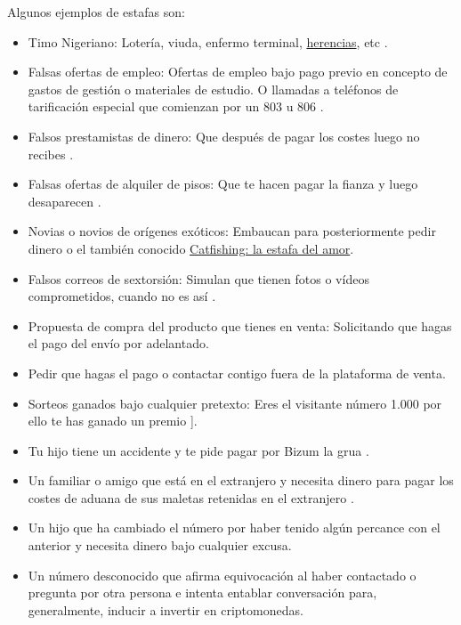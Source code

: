 \documentclass[
  a4paper,
  openany]{book}
\begin{document}
Algunos ejemplos de estafas son:

\begin{itemize}
\item
  Timo Nigeriano: Lotería, viuda, enfermo terminal, \href{https://www.incibe.es/ciudadania/blog/sabias-que-el-95-de-las-incidencias-en-ciberseguridad-se-deben-errores}{herencias}, etc \citep{WIKI-timo-nigeriano}.
\item
  Falsas ofertas de empleo: Ofertas de empleo bajo pago previo en concepto de gastos de gestión o materiales de estudio. O llamadas a teléfonos de tarificación especial que comienzan por un 803 u 806 \citep{INCI-falsas-ofertas-empleo}.
\item
  Falsos prestamistas de dinero: Que después de pagar los costes luego no recibes \citep{INCI-falsos-prestamos}.
\item
  Falsas ofertas de alquiler de pisos: Que te hacen pagar la fianza y luego desaparecen \citep{INCI-falsos-alquileres}.
\item
  Novias o novios de orígenes exóticos: Embaucan para posteriormente pedir dinero \citep{INCI-novias-exoticas} o el también conocido \href{https://www.incibe.es/ciudadania/blog/catfishing-la-estafa-del-amor}{Catfishing: la estafa del amor}.
\item
  Falsos correos de sextorsión: Simulan que tienen fotos o vídeos comprometidos, cuando no es así \citep{INCI-correos-sextorsion}.
\item
  Propuesta de compra del producto que tienes en venta: Solicitando que hagas el pago del envío por adelantado.
\item
  Pedir que hagas el pago o contactar contigo fuera de la plataforma de venta.
\item
  Sorteos ganados bajo cualquier pretexto: Eres el visitante número 1.000 por ello te has ganado un premio \citep{INCI-ganador-sorteo}{]}.
\item
  Tu hijo tiene un accidente y te pide pagar por Bizum la grua \citep{INCI-bizum}.
\item
  Un familiar o amigo que está en el extranjero y necesita dinero para pagar los costes de aduana de sus maletas retenidas en el extranjero \citep{INCI-whatsapp-fraude-familiar}.
\item
  Un hijo que ha cambiado el número por haber tenido algún percance con el anterior y necesita dinero bajo cualquier excusa.
\item
  Un número desconocido que afirma equivocación al haber contactado o pregunta por otra persona e intenta entablar conversación para, generalmente, inducir a invertir en criptomonedas.

\end{itemize}
\end{document}
